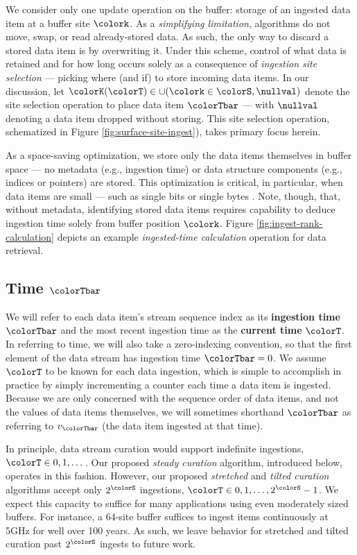We consider only one update operation on the buffer: storage of an ingested data item at a buffer site $\colork$.
As a \textit{simplifying limitation}, algorithms do not move, swap, or read already-stored data.
As such, the only way to discard a stored data item is by overwriting it.
Under this scheme, control of what data is retained and for how long occurs solely as a consequence of \textit{ingestion site selection} --- picking where (and if) to store incoming data items.
In our discussion, let $\colorK(\colorT) \in \cup(\colork \in \colorS, \nullval)$ denote the site selection operation to place data item $\colorTbar$ --- with $\nullval$ denoting a data item dropped without storing.
This site selection operation, schematized in Figure \ref{fig:surface-site-ingest}), takes primary focus herein.

As a space-saving optimization, we store only the data items themselves in buffer space --- no metadata (e.g., ingestion time) or data structure components (e.g., indices or pointers) are stored.
This optimization is critical, in particular, when data items are small --- such as single bits or single bytes \citep{moreno2022hereditary}.
Note, though, that, without metadata, identifying stored data items requires capability to deduce ingestion time solely from buffer position $\colork$.
Figure \ref{fig:ingest-rank-calculation} depicts an example \textit{ingested-time calculation} operation for data retrieval.

\subsection{Time $\colorTbar$}
\label{sec:notation-time}

We will refer to each data item's stream sequence index as its \textbf{ingestion time} $\colorTbar$ and the most recent ingestion time as the \textbf{current time} $\colorT$.
In referring to time, we will also take a zero-indexing convention, so that the first element of the data stream has ingestion time $\colorTbar=0$.
We assume $\colorT$ to be known for each data ingestion, which is simple to accomplish in practice by simply incrementing a counter each time a data item is ingested.
Because we are only concerned with the sequence order of data items, and not the values of data items themselves, we will sometimes shorthand $\colorTbar$ as referring to $v_{\colorTbar}$ (the data item ingested at that time).

In principle, data stream curation would support indefinite ingestions, $\colorT \in 0, 1, \ldots \,$.
Our proposed \textit{steady curation} algorithm, introduced below, operates in this fashion.
However, our proposed \textit{stretched} and \textit{tilted curation} algorithms accept only $2^{\colorS}$ ingestions, $\colorT \in 0, 1, \ldots, 2^{\colorS} - 1$.
We expect this capacity to suffice for many applications using even moderately sized buffers.
For instance, a 64-site buffer suffices to ingest items continuously at 5GHz for well over 100 years.
As such, we leave behavior for stretched and tilted curation past $2^{\colorS}$ ingests to future work.

